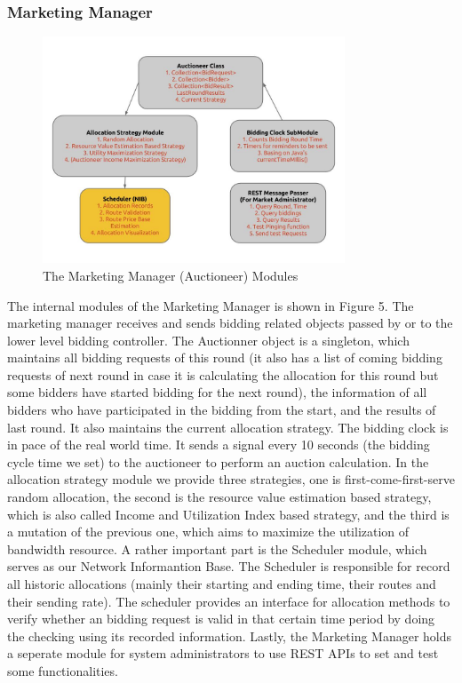 \documentclass[a4paper,11pt,twocolumn]{article}
\begin{document}
\subsubsection{Marketing Manager}

\begin{figure}[ht!]
\centering
\includegraphics[width=90mm]{core.jpg}
\caption{The Marketing Manager (Auctioneer) Modules}
\label{overflow}
\end{figure}

The internal modules of the Marketing Manager is shown in Figure 5. The marketing manager receives and sends bidding related objects passed by 
or to the lower level bidding controller. The Auctionner object is a singleton, which maintains all bidding requests of this round (it also
has a list of coming bidding requests of next round in case it is calculating the allocation for this round but some bidders have started
bidding for the next round), the information of all bidders who have participated in the bidding from the start, and the results of last round.
It also maintains the current allocation strategy. The bidding clock is in pace of the real world time. It sends a signal every 10 seconds (the 
bidding cycle time we set) to the auctioneer to perform an auction calculation. In the allocation strategy module we provide three strategies,
one is first-come-first-serve random allocation, the second is the resource value estimation based strategy, which is also called Income and Utilization 
Index based strategy, and the third is a mutation of the previous one, which aims to maximize the utilization of bandwidth resource. A rather
important part is the Scheduler module, which serves as our Network Informantion Base. The Scheduler is responsible for record all historic 
allocations (mainly their starting and ending time, their routes and their sending rate). The scheduler provides an interface for allocation methods
to verify whether an bidding request is valid in that certain time period by doing the checking using its recorded information. Lastly, the Marketing
Manager holds a seperate module for system administrators to use REST APIs to set and test some functionalities.
\end{document}
